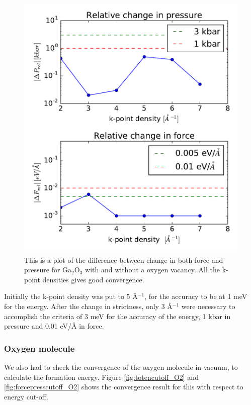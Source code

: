 \begin{figure}[H]
\includegraphics[width=\linewidth]{../fig/deltaforcepressrel_kpoints.pdf}\caption{This is a plot of the difference between change in both force and pressure for $\text{Ga}_2\text{O}_3$ with and without a oxygen vacancy. All the k-point densities gives good convergence.}\label{fig:forcepresskpoints}
\end{figure}

Initially the k-point density was put to 5 Å$^{-1}$, for the accuracy to be at 1 meV for the energy. After the change in strictness, only 3 Å$^{-1}$ were necessary to accomplish the criteria of 3 meV for the accuracy of the energy, 1 kbar in pressure and 0.01 eV/Å in force. 

\subsubsection{Oxygen molecule}

We also had to check the convergence of the oxygen molecule in vacuum, to calculate the formation energy. Figure \ref{fig:totencutoff_O2} and \ref{fig:forcepresscutoff_O2} shows the convergence result for this with respect to energy cut-off.


